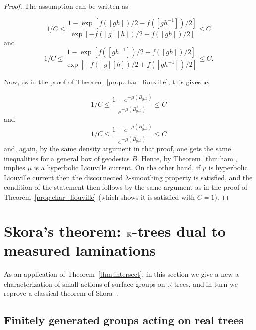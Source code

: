 \begin{proof}
The assumption can be written as 

 \begin{equation}
     1/C \leq  \frac{1- \exp \left[f\left([gh]\right)/2 - f\left([gh^{-1}]\right)/2 \right]}{\exp \left[ -f\left([g][h]\right)/2 + f\left([gh]\right)/2 \right]} \leq C
    \end{equation}
    and
 \begin{equation}
    1/C \leq \frac{1- \exp \left[f\left([gh^{-1}]\right)/2 - f\left([gh]\right)/2\right]}{\exp \left[-f\left([g][h]\right)/2 + f\left([gh^{-1}]\right)/2\right]} \leq C.
    \end{equation}
    
    Now, as in the proof of Theorem~\ref{prop:char_liouville}, this gives us

     \begin{equation}
    1/C \leq \frac{1 - e^{-\mu(B_{g,h})}}{e^{-\mu(B_{g,h}^{\perp})}} \leq C
    \end{equation}
    and
    \begin{equation}
    1/C \leq \frac{1 - e^{-\mu(B_{g,h}^{\perp})}}{e^{-\mu(B_{g,h})}} \leq C
    \end{equation}
    and, again, by the same density argument in that proof, one gets the same inequalities for a general box of geodesics $B$. Hence, by Theorem~\ref{thm:ham}, implies $\mu$ is a hyperbolic Liouville current.
On the other hand, if $\mu$ is hyperbolic Liouville current then the disconnected $\lambda$-smoothing property is satisfied, and the condition of the statement then follows by the same argument as in the proof of Theorem~\ref{prop:char_liouville} (which shows it is satisfied with $C=1$).
\end{proof}

\section{Skora's theorem: \texorpdfstring{$\protect\mathbb{R}$-trees}{Rtrees} dual to measured laminations}
\label{sec:skora}


As an application of Theorem~\ref{thm:intersect}, in this section we give a new a characterization of small actions of surface groups on $\mathbb{R}$-trees, and in turn we reprove a classical theorem of Skora~\cite{Sko90:GeometricAction}.

\subsection{Finitely generated groups acting on real trees}


